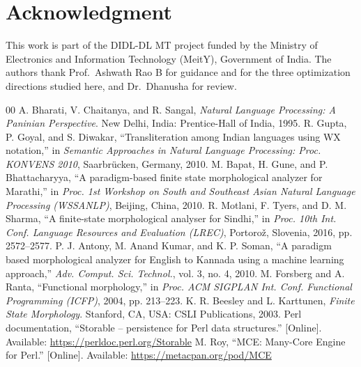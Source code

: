 \documentclass[conference]{IEEEtran}
\begin{document}
\section*{Acknowledgment}
This work is part of the DIDL-DL MT project funded by the Ministry of Electronics and Information Technology (MeitY), Government of India. The authors thank Prof.\ Ashwath Rao B for guidance and for the three optimization directions studied here, and Dr.\ Dhanusha for review.

\begin{thebibliography}{00}
 A. Bharati, V. Chaitanya, and R. Sangal, \textit{Natural Language Processing: A Paninian Perspective}. New Delhi, India: Prentice-Hall of India, 1995.
 R. Gupta, P. Goyal, and S. Diwakar, ``Transliteration among Indian languages using WX notation,'' in \textit{Semantic Approaches in Natural Language Processing: Proc. KONVENS 2010}, Saarbr\"ucken, Germany, 2010. %
 M. Bapat, H. Gune, and P. Bhattacharyya, ``A paradigm-based finite state morphological analyzer for Marathi,'' in \textit{Proc. 1st Workshop on South and Southeast Asian Natural Language Processing (WSSANLP)}, Beijing, China, 2010. %
 R. Motlani, F. Tyers, and D. M. Sharma, ``A finite-state morphological analyser for Sindhi,'' in \textit{Proc. 10th Int. Conf. Language Resources and Evaluation (LREC)}, Portoro\v{z}, Slovenia, 2016, pp. 2572--2577.
 P. J. Antony, M. Anand Kumar, and K. P. Soman, ``A paradigm based morphological analyzer for English to Kannada using a machine learning approach,'' \textit{Adv. Comput. Sci. Technol.}, vol. 3, no. 4, 2010.
 M. Forsberg and A. Ranta, ``Functional morphology,'' in \textit{Proc. ACM SIGPLAN Int. Conf. Functional Programming (ICFP)}, 2004, pp. 213--223. %
 K. R. Beesley and L. Karttunen, \textit{Finite State Morphology}. Stanford, CA, USA: CSLI Publications, 2003.
 Perl documentation, ``Storable -- persistence for Perl data structures.'' [Online]. Available: \url{https://perldoc.perl.org/Storable}
 M. Roy, ``MCE: Many-Core Engine for Perl.'' [Online]. Available: \url{https://metacpan.org/pod/MCE}
\end{thebibliography}
\end{document}
